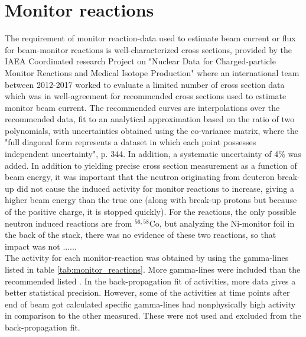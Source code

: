 \section{Monitor reactions}
The requirement of monitor reaction-data used to estimate beam current or flux for beam-monitor reactions is well-characterized cross sections, provided by the IAEA Coordinated research Project on "Nuclear Data for Charged-particle Monitor Reactions and Medical Isotope Production" where an international team between 2012-2017 worked to evaluate a limited number of cross section data which was in well-agreement \cite{Hermanne2018a} for recommended cross sections used to estimate monitor beam current. The recommended curves are interpolations over the recommended data, fit to an analytical approximation based on the ratio of two polynomials, with uncertainties obtained using the co-variance matrix, where the "full diagonal form represents a dataset in which each point possesses independent uncertainty"\cite{Hermanne2018a}, p. 344. In addition, a systematic uncertainty of 4\% was added. In addition to yielding precise cross section measurement as a function of beam energy, it was important that the neutron originating from deuteron break-up did not cause the induced activity for monitor reactions to increase, giving a higher beam energy than the true one (along with break-up protons but because of the positive charge, it is stopped quickly). For the reactions, the only possible neutron induced reactions are from $^{56,58}$Co, but analyzing the Ni-monitor foil in the back of the stack, there was no evidence of these two reactions, so that impact was not ......  \\ 

The activity for each monitor-reaction was obtained by using the gamma-lines listed in table \ref{tab:monitor_reactions}. More gamma-lines were included than the recommended listed \cite{Hermanne2018a}. In the back-propagation fit of activities, more data gives a better statistical precision. However, some of the activities at time points after end of beam got calculated specific gamma-lines had nonphysically high activity in comparison to the other measured. These were not used and excluded from the back-propagation fit. \\

